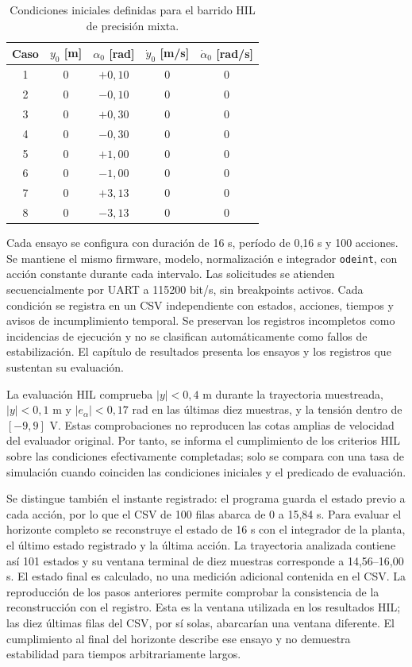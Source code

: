 \begin{table}[htbp]
\centering\small
\caption{Condiciones iniciales definidas para el barrido HIL de precisión mixta.}
\label{tab:hil_ocho}
\begin{tabular}{ccccc}
\toprule
Caso & $y_0$ [m] & $\alpha_0$ [rad] & $\dot y_0$ [m/s] & $\dot\alpha_0$ [rad/s] \\
\midrule
1 & 0 & $+0{,}10$ & 0 & 0 \\
2 & 0 & $-0{,}10$ & 0 & 0 \\
3 & 0 & $+0{,}30$ & 0 & 0 \\
4 & 0 & $-0{,}30$ & 0 & 0 \\
5 & 0 & $+1{,}00$ & 0 & 0 \\
6 & 0 & $-1{,}00$ & 0 & 0 \\
7 & 0 & $+3{,}13$ & 0 & 0 \\
8 & 0 & $-3{,}13$ & 0 & 0 \\
\bottomrule
\end{tabular}
\end{table}

Cada ensayo se configura con duración de 16 s, período de 0,16 s y 100 acciones. Se mantiene el mismo firmware, modelo, normalización e integrador \texttt{odeint}, con acción constante durante cada intervalo. Las solicitudes se atienden secuencialmente por UART a 115200 bit/s, sin breakpoints activos. Cada condición se registra en un CSV independiente con estados, acciones, tiempos y avisos de incumplimiento temporal. Se preservan los registros incompletos como incidencias de ejecución y no se clasifican automáticamente como fallos de estabilización. El capítulo de resultados presenta los ensayos y los registros que sustentan su evaluación.

La evaluación HIL comprueba $|y|<0{,}4$ m durante la trayectoria muestreada, $|y|<0{,}1$ m y $|e_\alpha|<0{,}17$ rad en las últimas diez muestras, y la tensión dentro de $[-9,9]$ V. Estas comprobaciones no reproducen las cotas amplias de velocidad del evaluador original. Por tanto, se informa el cumplimiento de los criterios HIL sobre las condiciones efectivamente completadas; solo se compara con una tasa de simulación cuando coinciden las condiciones iniciales y el predicado de evaluación.

Se distingue también el instante registrado: el programa guarda el estado previo a cada acción, por lo que el CSV de 100 filas abarca de 0 a 15,84 s. Para evaluar el horizonte completo se reconstruye el estado de 16 s con el integrador de la planta, el último estado registrado y la última acción. La trayectoria analizada contiene así 101 estados y su ventana terminal de diez muestras corresponde a 14,56--16,00 s. El estado final es calculado, no una medición adicional contenida en el CSV. La reproducción de los pasos anteriores permite comprobar la consistencia de la reconstrucción con el registro. Esta es la ventana utilizada en los resultados HIL; las diez últimas filas del CSV, por sí solas, abarcarían una ventana diferente. El cumplimiento al final del horizonte describe ese ensayo y no demuestra estabilidad para tiempos arbitrariamente largos.

